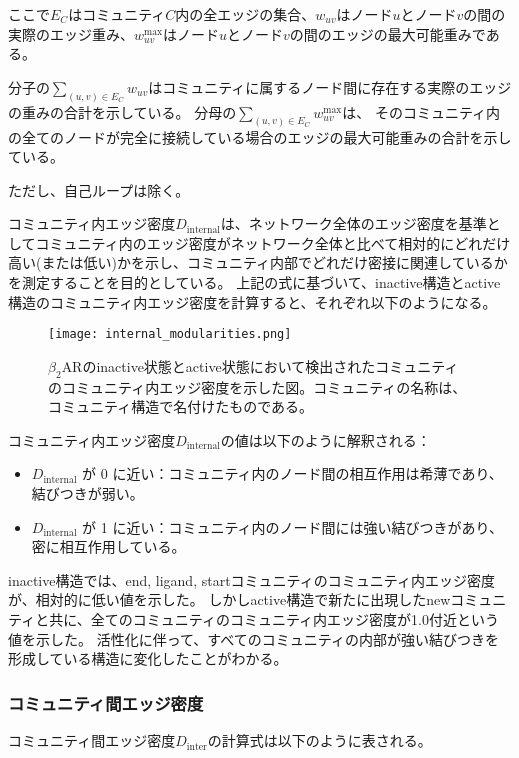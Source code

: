 ここで$E_C$はコミュニティ$C$内の全エッジの集合、$w_{uv}$はノード$u$とノード$v$の間の実際のエッジ重み、$w_{uv}^{\text{max}}$はノード$u$とノード$v$の間のエッジの最大可能重みである。

分子の$\sum_{(u,v) \in E_C} w_{uv}$はコミュニティに属するノード間に存在する実際のエッジの重みの合計を示している。
分母の$\sum_{(u,v) \in E_C} w_{uv}^{\text{max}}$は、
そのコミュニティ内の全てのノードが完全に接続している場合のエッジの最大可能重みの合計を示している。

ただし、自己ループは除く。


コミュニティ内エッジ密度$D_{\text{internal}}$は、ネットワーク全体のエッジ密度を基準としてコミュニティ内のエッジ密度がネットワーク全体と比べて相対的にどれだけ高い(または低い)かを示し、コミュニティ内部でどれだけ密接に関連しているかを測定することを目的としている。
上記の式に基づいて、inactive構造とactive構造のコミュニティ内エッジ密度を計算すると、それぞれ以下のようになる。

\begin{figure}[htbp]
    \centering
    \texttt{[image: internal\_modularities.png]}
    \caption{$\beta_2$ARのinactive状態とactive状態において検出されたコミュニティのコミュニティ内エッジ密度を示した図。コミュニティの名称は、コミュニティ構造で名付けたものである。}
    \label{fig:internal}
\end{figure}

\newpage

コミュニティ内エッジ密度$D_{\text{internal}}$の値は以下のように解釈される：
\begin{itemize}
    \item \( D_{\text{internal}} \) が 0 に近い：コミュニティ内のノード間の相互作用は希薄であり、結びつきが弱い。
    \item \( D_{\text{internal}} \) が 1 に近い：コミュニティ内のノード間には強い結びつきがあり、密に相互作用している。
\end{itemize}

inactive構造では、end, ligand, startコミュニティのコミュニティ内エッジ密度が、相対的に低い値を示した。
しかしactive構造で新たに出現したnewコミュニティと共に、全てのコミュニティのコミュニティ内エッジ密度が1.0付近という値を示した。
活性化に伴って、すべてのコミュニティの内部が強い結びつきを形成している構造に変化したことがわかる。

\subsubsection{コミュニティ間エッジ密度}
コミュニティ間エッジ密度$D_{\text{inter}}$の計算式は以下のように表される。


